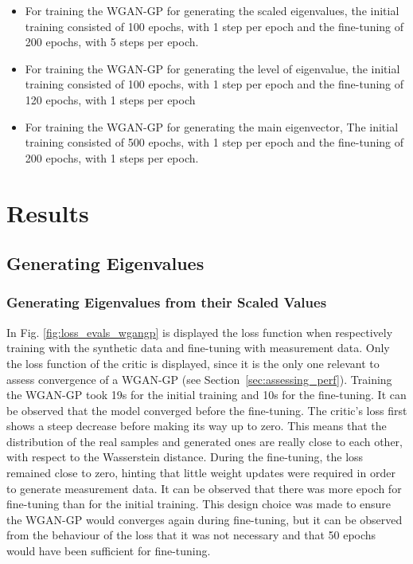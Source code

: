\documentclass[11pt,a4paper,twoside]{report}
\begin{document}
\begin{itemize}
    \item For training the WGAN-GP for generating the scaled eigenvalues, the initial training consisted of 100 epochs, with 1 step per epoch and the fine-tuning of 200 epochs, with 5 steps per epoch.
    \item For training the WGAN-GP for generating the level of eigenvalue, the initial training consisted of 100 epochs, with 1 step per epoch and the fine-tuning of 120 epochs, with 1 steps per epoch
    \item For training the WGAN-GP for generating the main eigenvector, The initial training consisted of 500 epochs, with 1 step per epoch and the fine-tuning of 200 epochs, with 1 steps per epoch.
\end{itemize}

\chapter{Results}

\section{Generating Eigenvalues} 

\subsection{Generating Eigenvalues from their Scaled Values}

In Fig. \ref{fig:loss_evals_wgangp}  is displayed the loss function when respectively training with the synthetic data and fine-tuning with measurement data. Only the loss function of the critic is displayed, since it is the only one relevant to assess convergence of a WGAN-GP (see Section~\ref{sec:assessing_perf}). Training the WGAN-GP took 19s for the initial training and 10s for the fine-tuning. It can be observed that the model converged before the fine-tuning. The critic's loss first shows a steep decrease before making its way up to zero. This means that the distribution of the real samples and generated ones are really close to each other, with respect to the Wasserstein distance. During the fine-tuning, the loss remained close to zero, hinting that little weight updates were required in order to generate measurement data. It can be observed that there was more epoch for fine-tuning than for the initial training. This design choice was made to ensure the WGAN-GP would converges again during fine-tuning, but it can be observed from the behaviour of the loss that it was not necessary and that 50 epochs would have been sufficient for fine-tuning.    
\end{document}
